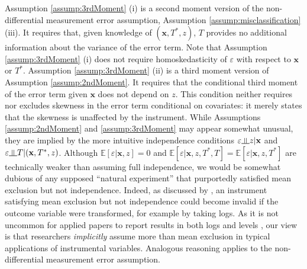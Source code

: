Assumption \ref{assump:3rdMoment} (i) is a second moment version of the non-differential measurement error assumption, Assumption \ref{assump:misclassification} (iii).
It requires that, given knowledge of $(\mathbf{x}, T^*,z)$, $T$ provides no additional information about the variance of the error term.
Note that Assumption \ref{assump:3rdMoment} (i) does not require homoskedasticity of $\varepsilon$ with respect to $\mathbf{x}$ or $T^*$.
Assumption \ref{assump:3rdMoment} (ii) is a third moment version of Assumption \ref{assump:2ndMoment}.
It requires that the conditional third moment of the error term given $\mathbf{x}$ does not depend on $z$.
This condition neither requires nor excludes skewness in the error term conditional on covariates: it merely states that the skewness is unaffected by the instrument.
While Assumptions \ref{assump:2ndMoment} and \ref{assump:3rdMoment} may appear somewhat unusual, they are implied by the more intuitive independence conditions
$\varepsilon \indep z |\mathbf{x}$ and $\varepsilon \indep T | (\mathbf{x}, T^*, z)$.
Although $\mathbb{E}[\varepsilon|\mathbf{x},z]=0$ and $\mathbb{E}[\varepsilon|\mathbf{x},z,T^*,T] = \mathbb{E}[\varepsilon|\mathbf{x},z,T^*]$ are technically weaker than assuming full independence, we would be somewhat dubious of any supposed ``natural experiment'' that purportedly satisfied mean exclusion but not independence.
Indeed, as discussed by \cite{ImbensRubin1997}, an instrument satisfying mean exclusion but not independence could become invalid if the outcome variable were transformed, for example by taking logs.
As it is not uncommon for applied papers to report results in both logs and levels \citep[e.g.][]{angrist1990}, our view is that researchers \emph{implicitly} assume more than mean exclusion in typical applications of instrumental variables. 
Analogous reasoning applies to the non-differential measurement error assumption.


